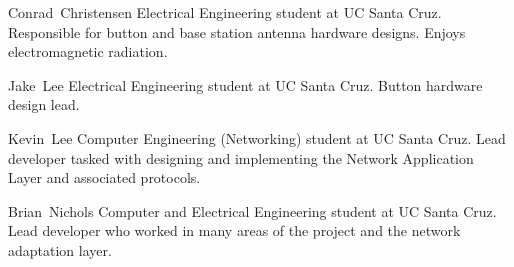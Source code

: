 \documentclass[journal,compsoc]{IEEEtran}
\begin{document}
\begin{IEEEbiography}
{Conrad~Christensen}
  Electrical Engineering student at UC Santa Cruz. Responsible for button and base station antenna hardware designs. Enjoys electromagnetic radiation.
\end{IEEEbiography}

\begin{IEEEbiography}
{Jake~Lee}
  Electrical Engineering student at UC Santa Cruz.  Button hardware design lead.  
\end{IEEEbiography}

\begin{IEEEbiography}
{Kevin~Lee}
  Computer Engineering (Networking) student at UC Santa Cruz. Lead developer tasked with designing and implementing the Network Application Layer and associated protocols.
\end{IEEEbiography}

\begin{IEEEbiography}
{Brian~Nichols}
  Computer and Electrical Engineering student at UC Santa Cruz. Lead developer who worked in many areas of the project and the network adaptation layer. 
\end{IEEEbiography}
\end{document}
